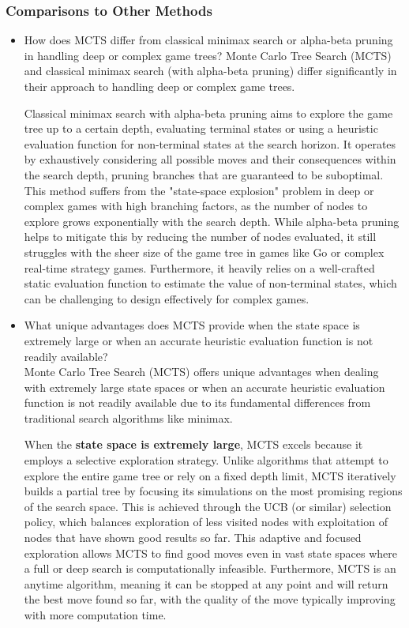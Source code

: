 \subsubsection{Comparisons to Other Methods}
\begin{itemize}
    \item How does MCTS differ from classical minimax search or alpha-beta pruning in handling deep or complex game trees?  
    Monte Carlo Tree Search (MCTS) and classical minimax search (with alpha-beta pruning) differ significantly in their approach to handling deep or complex game trees.

Classical minimax search with alpha-beta pruning aims to explore the game tree up to a certain depth, evaluating terminal states or using a heuristic evaluation function for non-terminal states at the search horizon. It operates by exhaustively considering all possible moves and their consequences within the search depth, pruning branches that are guaranteed to be suboptimal. This method suffers from the "state-space explosion" problem in deep or complex games with high branching factors, as the number of nodes to explore grows exponentially with the search depth. While alpha-beta pruning helps to mitigate this by reducing the number of nodes evaluated, it still struggles with the sheer size of the game tree in games like Go or complex real-time strategy games. Furthermore, it heavily relies on a well-crafted static evaluation function to estimate the value of non-terminal states, which can be challenging to design effectively for complex games.
    \item What unique advantages does MCTS provide when the state space is extremely large or when an accurate heuristic evaluation function is not readily available?\\
    Monte Carlo Tree Search (MCTS) offers unique advantages when dealing with extremely large state spaces or when an accurate heuristic evaluation function is not readily available due to its fundamental differences from traditional search algorithms like minimax.

When the \textbf{state space is extremely large}, MCTS excels because it employs a selective exploration strategy. Unlike algorithms that attempt to explore the entire game tree or rely on a fixed depth limit, MCTS iteratively builds a partial tree by focusing its simulations on the most promising regions of the search space. This is achieved through the UCB (or similar) selection policy, which balances exploration of less visited nodes with exploitation of nodes that have shown good results so far. This adaptive and focused exploration allows MCTS to find good moves even in vast state spaces where a full or deep search is computationally infeasible. Furthermore, MCTS is an anytime algorithm, meaning it can be stopped at any point and will return the best move found so far, with the quality of the move typically improving with more computation time.


\end{itemize}
